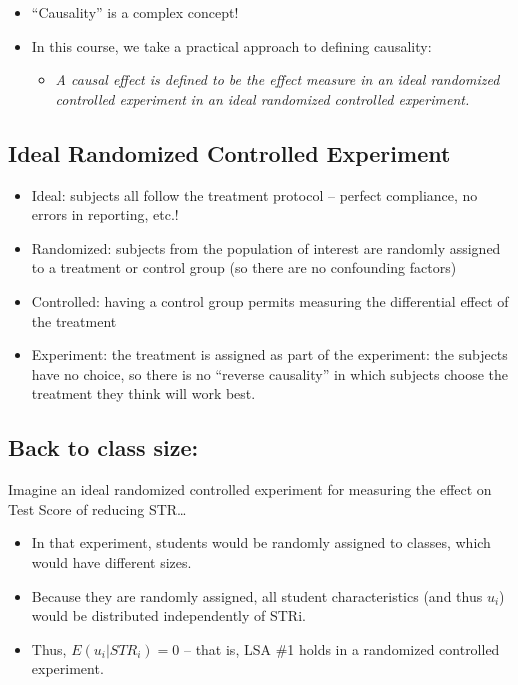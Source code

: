 \documentclass[
  letterpaper,
  DIV=11,
  numbers=noendperiod]{scrartcl}
\providecommand{\tightlist}{%
  \setlength{\itemsep}{0pt}\setlength{\parskip}{0pt}}\usepackage{longtable,booktabs,array}
\begin{document}
\begin{itemize}
\tightlist
\item
  ``Causality'' is a complex concept!
\item
  In this course, we take a practical approach to defining causality:

  \begin{itemize}
  \tightlist
  \item
    \emph{A causal effect is defined to be the effect measure in an
    ideal randomized controlled experiment} \emph{in an ideal randomized
    controlled experiment.}
  \end{itemize}
\end{itemize}

\hypertarget{ideal-randomized-controlled-experiment}{%
\subsection{Ideal Randomized Controlled
Experiment}\label{ideal-randomized-controlled-experiment}}

\begin{itemize}
\tightlist
\item
  Ideal: subjects all follow the treatment protocol -- perfect
  compliance, no errors in reporting, etc.!
\item
  Randomized: subjects from the population of interest are randomly
  assigned to a treatment or control group (so there are no confounding
  factors)
\item
  Controlled: having a control group permits measuring the differential
  effect of the treatment
\item
  Experiment: the treatment is assigned as part of the experiment: the
  subjects have no choice, so there is no ``reverse causality'' in which
  subjects choose the treatment they think will work best.
\end{itemize}

\hypertarget{back-to-class-size}{%
\subsection{Back to class size:}\label{back-to-class-size}}

Imagine an ideal randomized controlled experiment for measuring the
effect on Test Score of reducing STR\ldots{}

\begin{itemize}
\item
  In that experiment, students would be randomly assigned to classes,
  which would have different sizes.
\item
  Because they are randomly assigned, all student characteristics (and
  thus \(u_i\)) would be distributed independently of STRi.
\item
  Thus, \(E(u_i|STR_i)=0\) -- that is, LSA \#1 holds in a randomized
  controlled experiment.
\end{itemize}
\end{document}
